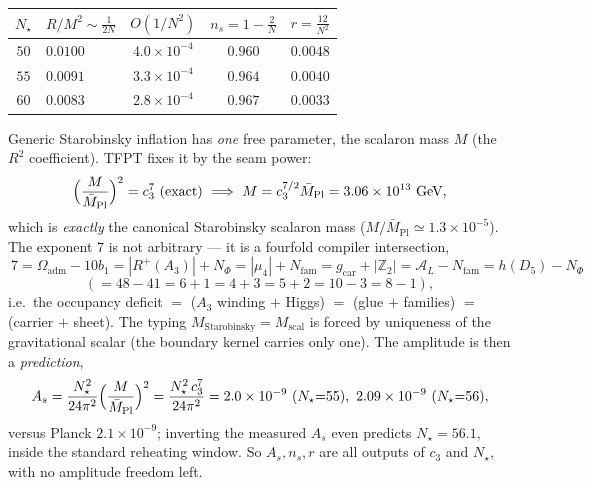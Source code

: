\documentclass[11pt,a4paper]{article}
\newcommand{\Mbar}{\bar M_{\mathrm{Pl}}}
\newcommand{\gcar}{g_{\mathrm{car}}}
\newcommand{\Nfam}{N_{\mathrm{fam}}}
\newcommand{\Oadm}{\Omega_{\mathrm{adm}}}
\newcommand{\cthree}{c_3}
\newcommand{\Z}{\mathbb{Z}}
\theoremstyle{definition}
\begin{document}
\begin{center}\small
\begin{tabularx}{0.8\linewidth}{@{}cYccc@{}}
\toprule
$N_\star$ & $R/M^2\sim\tfrac1{2N}$ & $O(1/N^2)$ & $n_s=1-\tfrac2N$ & $r=\tfrac{12}{N^2}$ \\
\midrule
$50$ & $0.0100$ & $4.0\times10^{-4}$ & $0.960$ & $0.0048$ \\
$55$ & $0.0091$ & $3.3\times10^{-4}$ & $0.964$ & $0.0040$ \\
$60$ & $0.0083$ & $2.8\times10^{-4}$ & $0.967$ & $0.0033$ \\
\bottomrule
\end{tabularx}
\end{center}

\begin{winbox}
Generic Starobinsky inflation has \emph{one} free parameter, the scalaron mass $M$ (the $R^2$
coefficient). TFPT fixes it by the seam power:
\[
  \Bigl(\frac{M}{\Mbar}\Bigr)^2=\cthree^7\ \text{(exact)}\ \Longrightarrow\ M=\cthree^{7/2}\Mbar
  =3.06\times10^{13}\ \mathrm{GeV},
\]
which is \emph{exactly} the canonical Starobinsky scalaron mass ($M/\Mbar\simeq1.3\times10^{-5}$). The
exponent $7$ is not arbitrary --- it is a fourfold compiler intersection,
\[
  \boxed{\ 7=\Oadm-10b_1=|R^+(A_3)|+N_\Phi=|\mu_4|+\Nfam=\gcar+|\Z_2|=\mathcal A_L-\Nfam=h(D_5)-N_\Phi\ }
\]
\[
  (=48{-}41=6{+}1=4{+}3=5{+}2=10{-}3=8{-}1),
\]
i.e.\ the occupancy deficit $=$ ($A_3$ winding $+$ Higgs) $=$ (glue $+$ families) $=$ (carrier $+$ sheet).
The typing $M_{\mathrm{Starobinsky}}=M_{\mathrm{scal}}$ is forced by uniqueness of the gravitational scalar
(the boundary kernel carries only one). The amplitude is then a \emph{prediction},
\[
  A_s=\frac{N_\star^2}{24\pi^2}\Bigl(\frac{M}{\Mbar}\Bigr)^2=\frac{N_\star^2\,\cthree^7}{24\pi^2}
  =2.0\times10^{-9}\ (N_\star{=}55),\ 2.09\times10^{-9}\ (N_\star{=}56),
\]
versus Planck $2.1\times10^{-9}$; inverting the measured $A_s$ even predicts $N_\star=56.1$, inside the
standard reheating window. So $A_s,n_s,r$ are all outputs of $\cthree$ and $N_\star$, with no amplitude
freedom left.
\end{winbox}
\end{document}
